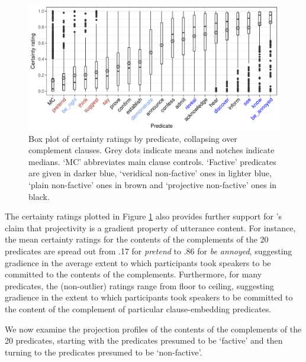 \documentclass[11pt,fleqn]{article}
\newcommand{\6}{\mbox{$[\hspace*{-.6mm}[$}}
\newcommand{\9}{\mbox{$]\hspace*{-.6mm}]$}}
\newcommand{\citepos}[1]{\citeauthor{#1}'s \citeyear{#1}}
\begin{document}
\begin{figure}[H]
\centering

\includegraphics[width=.75\paperwidth]{../results/5-projectivity-no-fact/graphs/boxplot-projectivity}

\caption{Box plot of certainty ratings by predicate, collapsing over complement clauses. Grey dots indicate means and notches indicate medians. `MC' abbreviates main clause controls. `Factive' predicates are given in darker blue, `veridical non-factive' ones in lighter blue, `plain non-factive' ones in brown and `projective non-factive' ones in black.}
\label{f-projectivity}
\end{figure}

The certainty ratings plotted in Figure \ref{f-projectivity} also provides further support for \citepos{tbd-variability} claim that projectivity is a gradient property of utterance content. For instance, the mean certainty ratings for the contents of the complements of the 20 predicates are spread out from .17 for {\em pretend} to .86 for {\em be annoyed}, suggesting gradience in the average extent to which participants took speakers to be committed to the contents of the complements. Furthermore, for many predicates, the (non-outlier) ratings range from floor to ceiling, suggesting gradience in the extent to which participants took speakers to be committed to the content of the complement of particular clause-embedding predicates. 

We now examine the projection profiles of the contents of the complements of the 20 predicates, starting with the predicates presumed to be `factive' and then turning to the predicates presumed to be `non-factive'.
\end{document}
